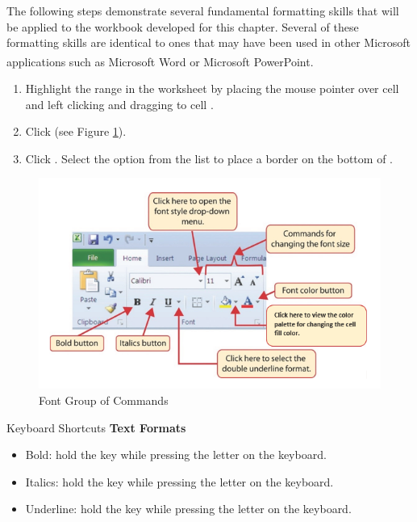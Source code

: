 The following steps demonstrate several fundamental formatting skills that will be applied to the workbook developed for this chapter. Several of these formatting skills are identical to ones that may have been used in other Microsoft applications such as Microsoft\textsuperscript{\textregistered} Word\textsuperscript{\textregistered} or Microsoft\textsuperscript{\textregistered} PowerPoint\textsuperscript{\textregistered}.

\begin{enumerate}
	\item Highlight the range  in the  worksheet by placing the mouse pointer over cell  and left clicking and dragging to cell . 
	\item Click  (see Figure \ref{01:fig34}).
	\item Click . Select the  option from the list to place a border on the bottom of .
\end{enumerate}

\begin{figure}[H]
	\centering
	\includegraphics[width=\maxwidth{.95\linewidth}]{gfx/ch01_fig34}
	\caption{Font Group of Commands}
	\label{01:fig34}
\end{figure}

\begin{center}
	\begin{shtcutbox}{Keyboard Shortcuts}
		\textbf{Text Formats}
		\\
		\begin{itemize}
			\setlength{\itemsep}{0pt}
			\setlength{\parskip}{0pt}
			\setlength{\parsep}{0pt}
			
			\item Bold: hold the  key while pressing the letter  on the keyboard.
			\item Italics: hold the  key while pressing the letter  on the keyboard.
			\item Underline: hold the  key while pressing the letter  on the keyboard.
			
		\end{itemize}
	\end{shtcutbox}
\end{center}

